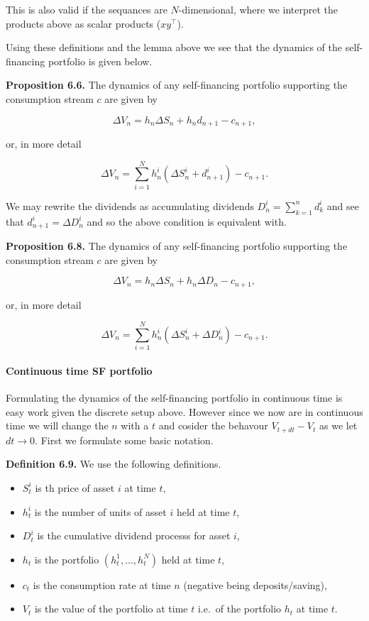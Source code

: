 \documentclass[
]{article}
\providecommand{\tightlist}{%
  \setlength{\itemsep}{0pt}\setlength{\parskip}{0pt}}
\begin{document}
This is also valid if the sequances are \(N\)-dimensional, where we
interpret the products above as scalar products (\(xy^\top\)).

Using these definitions and the lemma above we see that the dynamics of
the self-financing portfolio is given below.

\textbf{Proposition 6.6.} The dynamics of any self-financing portfolio
supporting the consumption stream \(c\) are given by

\[
\Delta V_n=h_n \Delta S_n+h_nd_{n+1}-c_{n+1},
\]

or, in more detail

\[
\Delta V_n=\sum_{i=1}^Nh_n^i(\Delta S_n^i+d^i_{n+1})-c_{n+1}.
\]

We may rewrite the dividends as accumulating dividends
\(D^i_n=\sum_{k=1}^nd^i_k\) and see that \(d_{n+1}^i=\Delta D^i_n\) and
so the above condition is equivalent with.

\textbf{Proposition 6.8.} The dynamics of any self-financing portfolio
supporting the consumption stream \(c\) are given by

\[
\Delta V_n=h_n \Delta S_n+h_n\Delta D_n-c_{n+1},
\]

or, in more detail

\[
\Delta V_n=\sum_{i=1}^Nh_n^i(\Delta S_n^i+\Delta D^i_n)-c_{n+1}.
\]

\hypertarget{continuous-time-sf-portfolio}{%
\paragraph{Continuous time SF
portfolio}\label{continuous-time-sf-portfolio}}

Formulating the dynamics of the self-financing portfolio in continuous
time is easy work given the discrete setup above. However since we now
are in continuous time we will change the \(n\) with a \(t\) and cosider
the behavour \(V_{t+dt}-V_t\) as we let \(dt\to 0\). First we formulate
some basic notation.

\textbf{Definition 6.9.} We use the following definitions.

\begin{itemize}
\tightlist
\item
  \(S_t^i\) is th price of asset \(i\) at time \(t\),
\item
  \(h_t^i\) is the number of units of asset \(i\) held at time \(t\),
\item
  \(D_t^i\) is the cumulative dividend processs for asset \(i\),
\item
  \(h_t\) is the portfolio \((h_t^1,...,h_t^N)\) held at time \(t\),
\item
  \(c_t\) is the consumption rate at time \(n\) (negative being
  deposits/saving),
\item
  \(V_t\) is the value of the portfolio at time \(t\) i.e.~of the
  portfolio \(h_t\) at time \(t\).
\end{itemize}
\end{document}
